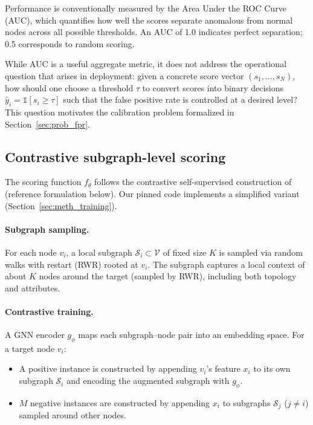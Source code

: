 \documentclass[a4paper]{cas-dc}
\theoremstyle{definition}
\begin{document}
Performance is conventionally measured by the Area Under the ROC Curve (AUC), which quantifies how well the scores separate anomalous from normal nodes across all possible thresholds.  An AUC of 1.0 indicates perfect separation; 0.5 corresponds to random scoring.

While AUC is a useful aggregate metric, it does not address the {operational} question that arises in deployment: {given a concrete score vector $(s_1, \ldots, s_N)$, how should one choose a threshold $\tau$ to convert scores into binary decisions $\hat{y}_i = \mathbb{1}[s_i \geq \tau]$ such that the false positive rate is controlled at a desired level?}  This question motivates the calibration problem formalized in Section~\ref{sec:prob_fpr}.

\subsection{Contrastive subgraph-level scoring}
\label{sec:prob_contrastive_scoring}

The scoring function $f_\theta$ follows the contrastive self-supervised construction of~\cite{liu2022cola} (reference formulation below).  Our pinned code implements a simplified variant (Section~\ref{sec:meth_training}).

\paragraph{Subgraph sampling.}
For each node $v_i$, a local subgraph $\mathcal{S}_i \subset \mathcal{V}$ of fixed size $K$ is sampled via random walks with restart (RWR) rooted at $v_i$.  The subgraph captures a local context of about $K$ nodes around the target (sampled by RWR), including both topology and attributes.

\paragraph{Contrastive training.}
A GNN encoder $g_\phi$ maps each subgraph--node pair into an embedding space. For a target node $v_i$:
\begin{itemize}
    \item A {positive instance} is constructed by appending $v_i$'s feature ${x}_i$ to its own subgraph $\mathcal{S}_i$ and encoding the augmented subgraph with $g_\phi$.
    \item $M$ {negative instances} are constructed by appending ${x}_i$ to subgraphs $\mathcal{S}_j$ ($j \neq i$) sampled around other nodes.
\end{itemize}
\end{document}
